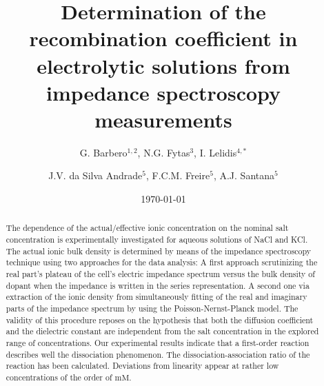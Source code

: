 \documentclass[preprint,aps,pre]{revtex4}
\begin{document}
\title{Determination of the recombination coefficient in electrolytic solutions from impedance spectroscopy measurements }

\author{G. Barbero$^{1,2}$, N.G. Fytas$^{3}$, I. Lelidis$^{4,*}$}

\author{J.V. da Silva Andrade$^5$, F.C.M. Freire$^5$, A.J. Santana$^5$}

\date{\today}

\begin{abstract}
	
The dependence of the actual/effective ionic concentration on the nominal salt concentration is experimentally investigated for aqueous solutions of NaCl and KCl. The actual ionic bulk density is determined by means of the impedance spectroscopy technique using two approaches for the data analysis: A first approach scrutinizing the real part's plateau of the cell's electric impedance spectrum versus the bulk density of dopant when the impedance is written in the series representation. A second one via  extraction of the ionic density from simultaneously fitting of the real and imaginary parts of the impedance spectrum by using the Poisson-Nernst-Planck model. The validity of this procedure reposes on the hypothesis that both the diffusion coefficient and the dielectric constant are independent from the salt concentration in the explored range of concentrations. Our experimental results indicate that a first-order reaction describes well the dissociation phenomenon. The dissociation-association ratio of the reaction has been calculated. Deviations from linearity appear at rather low concentrations of the order of $\mathrm{mM}$.
\end{abstract}
\end{document}
